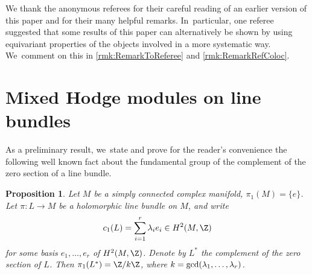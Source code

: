 \documentclass[JEP,XML,SOM,Unicode,published]{cedram}
\let\ra\rightarrow
\newtheorem{prop}[thm]{Proposition}
\begin{document}
We thank the anonymous referees for their careful reading of an earlier version of this paper and for their many helpful remarks. In~particular, one referee suggested that some results of this paper can alternatively be shown by using equivariant properties of the objects involved in a more systematic way. We~comment on this in \cref{rmk:RemarkToReferee} and \cref{rmk:RemarkRefColoc}.

\section{Mixed Hodge modules on line bundles} \label{sec:OBeta}

As a preliminary result, we~state and prove for the reader's convenience the following well known fact about the fundamental group of the complement of the zero section of a line bundle.

\begin{prop}\label{prop:PiEinsLStern}
Let $M$ be a simply connected complex manifold, \ie \hbox{$\pi_1(M)\!=\! \{e\}$}. Let $ \pi: L \ra M$ be a holomorphic line bundle on $M$, and write
\[
c_1(L)=\sum_{i=1}^r \lambda_i e_i \in H^2(M,\Z)
\]
for some basis $e_1,\ldots,e_r$ of $H^2(M,\Z)$.
Denote by $L^*$ the complement of the zero section of $L$. Then $\pi_1(L^*)=\Z/k \Z$, where $k=\textup{gcd}(\lambda_1,\ldots,\lambda_r)$.
\end{prop}
\end{document}
